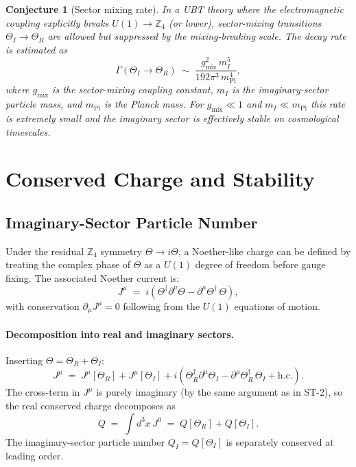 \documentclass[12pt]{article}
\newtheorem{conjecture}{Conjecture}
\begin{document}
\begin{conjecture}[Sector mixing rate]
\label{conj:mixing_rate}
In a UBT theory where the electromagnetic coupling explicitly breaks
$U(1) \to \mathbb{Z}_4$ (or lower), sector-mixing transitions
$\Theta_I \to \Theta_R$ are \emph{allowed but suppressed} by the
mixing-breaking scale.  The decay rate is estimated as
\begin{equation}
  \Gamma(\Theta_I \to \Theta_R)
  \;\sim\; \frac{g_\mathrm{mix}^2\,m_I^5}{192\pi^3\,m_\mathrm{Pl}^4},
\end{equation}
where $g_\mathrm{mix}$ is the sector-mixing coupling constant,
$m_I$ is the imaginary-sector particle mass, and $m_\mathrm{Pl}$
is the Planck mass.  For $g_\mathrm{mix} \ll 1$ and $m_I \ll m_\mathrm{Pl}$
this rate is extremely small and the imaginary sector is
effectively stable on cosmological timescales.
\end{conjecture}

\section{Conserved Charge and Stability}

\subsection{Imaginary-Sector Particle Number}

Under the residual $\mathbb{Z}_4$ symmetry $\Theta \to i\Theta$, a
Noether-like charge can be defined by treating the complex phase of
$\Theta$ as a $U(1)$ degree of freedom before gauge fixing.  The
associated Noether current is:
\begin{equation}
  J^\mu \;=\; i(\Theta^\dagger\partial^\mu\Theta - \partial^\mu\Theta^\dagger\,\Theta),
  \label{eq:noether_current}
\end{equation}
with conservation $\partial_\mu J^\mu = 0$ following from the $U(1)$
equations of motion.

\paragraph{Decomposition into real and imaginary sectors.}
Inserting $\Theta = \Theta_R + \Theta_I$:
\begin{equation}
  J^\mu
  \;=\; J^\mu[\Theta_R] + J^\mu[\Theta_I]
       + i\!\left(
           \Theta_R^\dagger\partial^\mu\Theta_I
         - \partial^\mu\Theta_R^\dagger\,\Theta_I
         + \mathrm{h.c.}
         \right).
\end{equation}
The cross-term in $J^\mu$ is purely imaginary (by the same argument
as in ST-2), so the real conserved charge decomposes as
\begin{equation}
  Q \;=\; \int d^3x\,J^0
  \;=\; Q[\Theta_R] + Q[\Theta_I].
\end{equation}
The imaginary-sector particle number
$Q_I = Q[\Theta_I]$ is separately conserved at leading order.
\end{document}
